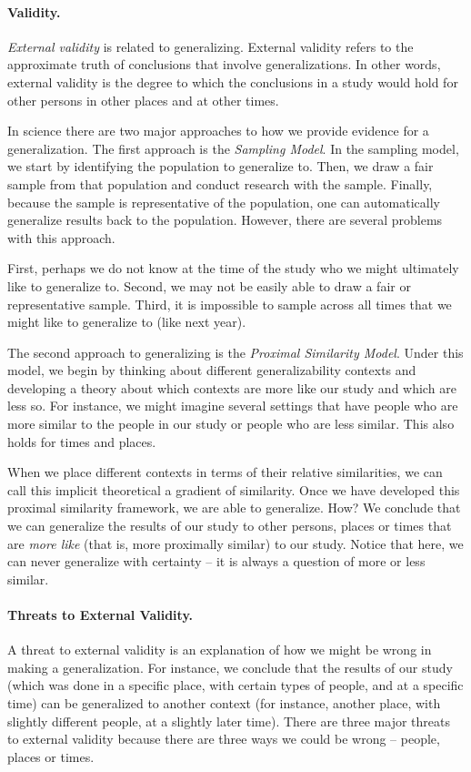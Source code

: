\paragraph{Validity.}
\emph{External validity} is related to generalizing.
External validity refers to the approximate truth of conclusions that involve generalizations. In other words, external validity is the degree to which the conclusions in a study would hold for other persons in other places and at other times.

In science there are two major approaches to how we provide evidence for a generalization. The first approach is the \emph{Sampling Model}.
In the sampling model, we start by identifying the population to generalize to. Then, we draw a fair sample from that population and conduct research with the sample. Finally, because the sample is representative of the population, one can automatically generalize results back to the population. However, there are several problems with this approach.

First, perhaps we do not know at the time of the study who we might ultimately like to generalize to. Second, we may not be easily able to draw a fair or representative sample. Third, it is impossible to sample across all times that we might like to generalize to (like next year).

The second approach to generalizing is the \emph{Proximal Similarity Model}.
Under this model, we begin by thinking about different generalizability contexts and developing a theory about which contexts are more like our study and which are less so. For instance, we might imagine several settings that have people who are more similar to the people in our study or people who are less similar. This also holds for times and places.

When we place different contexts in terms of their relative similarities, we can call this implicit theoretical a gradient of similarity. Once we have developed this proximal similarity framework, we are able to generalize. How? We conclude that we can generalize the results of our study to other persons, places or times that are \emph{more like} (that is, more proximally similar) to our study. Notice that here, we can never generalize with certainty -- it is always a question of more or less similar.

\paragraph{Threats to External Validity.}
A threat to external validity is an explanation of how we might be wrong in making a generalization. For instance, we conclude that the results of our study (which was done in a specific place, with certain types of people, and at a specific time) can be generalized to another context (for instance, another place, with slightly different people, at a slightly later time). There are three major threats to external validity because there are three ways we could be wrong -- people, places or times.

